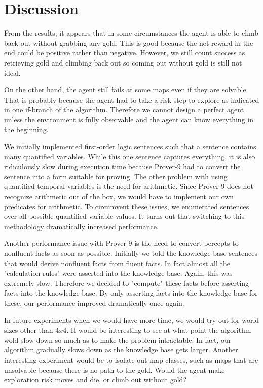 \section{Discussion}\label{sec:dis}

From the results, it appears that in some circumstances the agent is able to climb back out without grabbing any gold. This is good because the net reward in the end could be positive rather than negative. However, we still count success as retrieving gold and climbing back out so coming out without gold is still not ideal.

On the other hand, the agent still fails at some maps even if they are solvable. That is probably because the agent had to take a risk step to explore as indicated in one if-branch of the algorithm. Therefore we cannot design a perfect agent unless the environment is fully observable and the agent can know everything in the beginning.

We initially implemented first-order logic sentences such that a sentence contains many quantified variables. While this one sentence captures everything, it is also ridiculously slow during execution time because Prover-9 had to convert the sentence into a form suitable for proving. The other problem with using quantified temporal variables is the need for arithmetic. Since Prover-9 does not recognize arithmetic out of the box, we would have to implement our own predicates for arithmetic. To circumvent these issues, we enumerated sentences over all possible quantified variable values. It turns out that switching to this methodology dramatically increased performance.

Another performance issue with Prover-9 is the need to convert percepts to nonfluent facts as soon as possible. Initially we told the knowledge base sentences that would derive nonfluent facts from fluent facts. In fact almost all the "calculation rules" were asserted into the knowledge base. Again, this was extremely slow. Therefore we decided to "compute" these facts before asserting facts into the knowledge base. By only asserting facts into the knowledge base for these, our performance improved dramatically once again.

In future experiments when we would have more time, we would try out for world sizes other than $4x4$. It would be interesting to see at what point the algorithm wold slow down so much as to make the problem intractable. In fact, our algorithm gradually slows down as the knowledge base gets larger. Another interesting experiment would be to isolate out map classes, such as maps that are unsolvable because there is no path to the gold. Would the agent make exploration risk moves and die, or climb out without gold?
